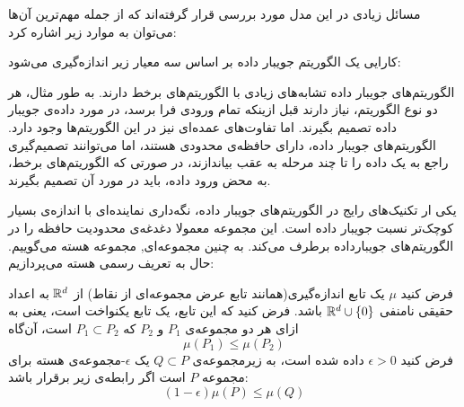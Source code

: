 مسائل زیادی در این مدل مورد بررسی قرار گرفته‌اند که از جمله مهم‌ترین آن‌ها می‌توان به موارد زیر اشاره کرد:






کارایی یک الگوریتم جویبار داده بر اساس سه معیار زیر اندازه‌گیری می‌شود:






الگوریتم‌های جویبار داده تشابه‌های زیادی با الگوریتم‌های برخط دارند. به طور مثال، هر دو نوع الگوریتم، نیاز دارند قبل ازینکه تمام ورودی فرا برسد، در مورد داده‌ی جویبار داده تصمیم بگیرند. اما تفاوت‌های عمده‌ای نیز در این الگوریتم‌ها وجود دارد. الگوریتم‌های جویبار داده، دارای حافظه‌ی محدودی هستند، اما می‌توانند تصمیم‌گیری راجع به یک داده را تا چند مرحله به عقب بیاندازند، در صورتی که الگوریتم‌های برخط، به محض ورود داده، باید در مورد آن تصمیم بگیرند.



یکی ار تکنیک‌های رایج در الگوریتم‌های جویبار داده، نگه‌داری نماینده‌ای با اندازه‌ی بسیار کوچک‌تر نسبت جویبار داده است. این مجموعه معمولا دغدغه‌ی محدودیت حافظه را در الگوریتم‌های جویبارداده برطرف می‌کند. به چنین مجموعه‌ای, مجموعه هسته می‌گوییم. حال به تعریف رسمی هسته می‌پردازیم:


فرض کنید $\mu$ یک تابع اندازه‌گیری(همانند تابع عرض مجموعه‌ای از نقاط) از $\mathbb{R}^d$ به اعداد حقیقی نامنفی $\mathbb{R}^d \cup \left\{ 0 \right\}$ باشد. فرض کنید که این تابع، یک تابع یکنواخت است، یعنی به ازای هر دو مجموعه‌ی $P_1$ و $P_2$ که $P_1 \subset P_2$ است، آن‌گاه
$$\mu(P_1) \leq \mu(P_2)$$
فرض کنید $\epsilon > 0$ داده شده است، به زیرمجموعه‌ی $Q \subset P$ یک $\epsilon$-مجموعه‌ی هسته برای مجموعه $P$ است اگر رابطه‌ی زیر برقرار باشد:
$$(1 - \epsilon) \mu(P) \leq \mu (Q)$$

